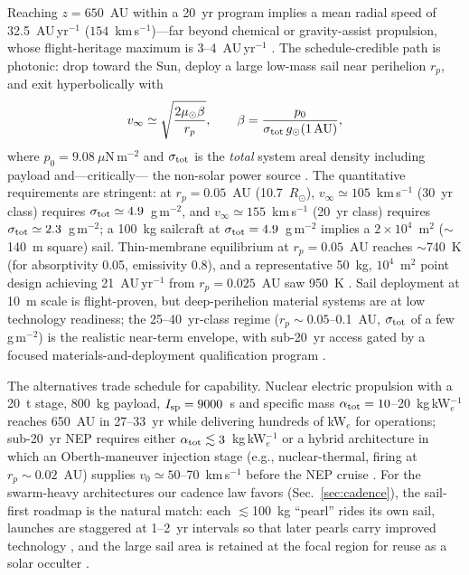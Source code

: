 ﻿\documentclass[twocolumn]{emulateapj}
\begin{document}
Reaching $z=650$~AU within a 20~yr program implies a mean radial speed
of 32.5~AU\,yr$^{-1}$ ($154$~km\,s$^{-1}$)---far beyond chemical or
gravity-assist propulsion, whose flight-heritage maximum is
3--4~AU\,yr$^{-1}$ \citep{tur26prop}. The schedule-credible path is
photonic: drop toward the Sun, deploy a large low-mass sail near
perihelion $r_p$, and exit hyperbolically with
\begin{equation}
v_\infty\simeq\sqrt{\frac{2\mu_\odot\beta}{r_p}},\qquad
\beta=\frac{p_0}{\sigma_{\rm tot}\,g_\odot(1\,{\rm AU})},
\end{equation}
where $p_0=9.08~\mu$N\,m$^{-2}$ and $\sigma_{\rm tot}$ is the
{\it total} system areal density including payload and---critically---
the non-solar power source \citep{tur26prop}. The quantitative
requirements are stringent: at $r_p=0.05$~AU (10.7~$R_\odot$),
$v_\infty\simeq105$~km\,s$^{-1}$ (30~yr class) requires
$\sigma_{\rm tot}\simeq4.9$~g\,m$^{-2}$, and
$v_\infty\simeq155$~km\,s$^{-1}$ (20~yr class) requires
$\sigma_{\rm tot}\simeq2.3$~g\,m$^{-2}$; a 100~kg sailcraft at
$\sigma_{\rm tot}=4.9$~g\,m$^{-2}$ implies a $2\times10^4$~m$^2$
($\sim$140~m square) sail. Thin-membrane equilibrium at $r_p=0.05$~AU
reaches $\sim$740~K (for absorptivity 0.05, emissivity 0.8), and a
representative 50~kg, $10^4$~m$^2$ point design achieving 21~AU\,yr$^{-1}$
from $r_p=0.025$~AU saw 950~K \citep{helvajian23}. Sail deployment at
10~m scale is flight-proven, but deep-perihelion material systems are at
low technology readiness; the 25--40~yr-class regime
($r_p\sim0.05$--0.1~AU, $\sigma_{\rm tot}$ of a few g\,m$^{-2}$) is the
realistic near-term envelope, with sub-20~yr access gated by a focused
materials-and-deployment qualification program \citep{tur26prop}.

The alternatives trade schedule for capability. Nuclear electric
propulsion with a 20~t stage, 800~kg payload, $I_{\rm sp}=9000$~s and
specific mass $\alpha_{\rm tot}=10$--20~kg\,kW$_e^{-1}$ reaches 650~AU
in 27--33~yr while delivering hundreds of kW$_e$ for operations; sub-20~yr
NEP requires either $\alpha_{\rm tot}\lesssim3$~kg\,kW$_e^{-1}$ or a
hybrid architecture in which an Oberth-maneuver injection stage
(e.g., nuclear-thermal, firing at $r_p\sim0.02$~AU) supplies
$v_0\simeq50$--70~km\,s$^{-1}$ before the NEP cruise
\citep{tur26prop}. For the swarm-heavy architectures our cadence law
favors (Sec.~\ref{sec:cadence}), the sail-first roadmap is the natural
match: each $\lesssim$100~kg ``pearl'' rides its own sail, launches are
staggered at 1--2~yr intervals so that later pearls carry improved
technology \citep{helvajian23}, and the large sail area is retained at
the focal region for reuse as a solar occulter \citep{tur26prop}.
\end{document}

